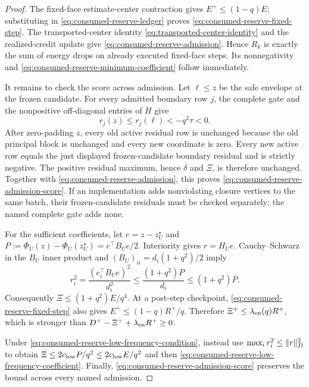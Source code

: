 \begin{proof}
The fixed-face estimate-center contraction gives
$E^+\leq(1-q)E$; substituting in
\cref{eq:consumed-reserve-ledger} proves
\cref{eq:consumed-reserve-fixed-step}.  The transported-center identity
\cref{eq:transported-center-identity} and the realized-credit update give
\cref{eq:consumed-reserve-admission}.  Hence $R_k$ is exactly the sum of
energy drops on already executed fixed-face steps.  Its nonnegativity and
\cref{eq:consumed-reserve-minimum-coefficient} follow immediately.

It remains to check the score across admission.  Let $\ell\leq z$ be the safe
envelope at the frozen candidate.  For every admitted boundary row $j$, the
complete gate and the nonpositive off-diagonal entries of $H$ give
\begin{equation*}
 r_j(z)\leq r_j(\ell)<-q^2\tau<0.
\end{equation*}
After zero-padding $z$, every old active residual row is unchanged because the
old principal block is unchanged and every new coordinate is zero.  Every new
active row equals the just displayed frozen-candidate boundary residual and is
strictly negative.  The positive residual maximum, hence $\delta$ and $\Xi$,
is therefore unchanged.  Together with
\cref{eq:consumed-reserve-admission}, this proves
\cref{eq:consumed-reserve-admission-score}.  If an implementation adds
nonviolating closure vertices to the same batch, their frozen-candidate
residuals must be checked separately; the named complete gate adds none.

For the sufficient coefficients, let $e=z-z_U^\star$ and
$P:=\Phi_U(z)-\Phi_U(z_U^\star)=e^\top B_Ue/2$.  Interiority gives
$r=H_Ue$.  Cauchy--Schwarz in the $B_U$ inner product and
$(B_U)_{ii}=d_i(1+q^2)/2$ imply
\begin{equation*}
 r_i^2=\frac{(e_i^\top B_Ue)^2}{d_i^2}
 \leq\frac{(1+q^2)P}{d_i}
 \leq(1+q^2)P.
\end{equation*}
Consequently $\Xi\leq(1+q^2)E/q^4$.  At a post-step checkpoint,
\cref{eq:consumed-reserve-fixed-step} also gives
$E^+\leq(1-q)R^+/q$.  Therefore
$\Xi^+\leq\lambda_{\rm en}(q)R^+$, which is stronger than
$D^+-\Xi^++\lambda_{\rm en}R^+\geq0$.

Under \cref{eq:consumed-reserve-low-frequency-condition}, instead use
$\max_i r_i^2\leq\lVert r\rVert_D^2$ to obtain
$\Xi\leq2c_{\rm low}P/q^2\leq2c_{\rm low}E/q^2$ and then
\cref{eq:consumed-reserve-low-frequency-coefficient}.  Finally,
\cref{eq:consumed-reserve-admission-score} preserves the bound across every
named admission.
\end{proof}

